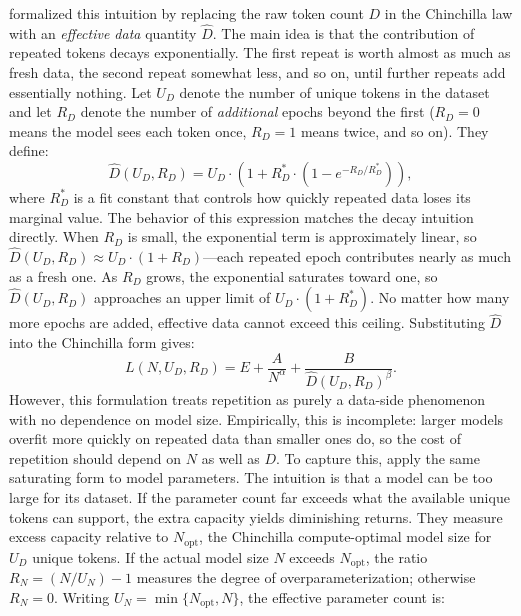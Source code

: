 \citet{muennighoff2023scaling} formalized this intuition by replacing the raw token count $D$ in the Chinchilla law with an \emph{effective data} quantity $\widehat{D}$. The main idea is that the contribution of repeated tokens decays exponentially. The first repeat is worth almost as much as fresh data, the second repeat somewhat less, and so on, until further repeats add essentially nothing. Let $U_D$ denote the number of unique tokens in the dataset and let $R_D$ denote the number of \emph{additional} epochs beyond the first ($R_D = 0$ means the model sees each token once, $R_D = 1$ means twice, and so on). They define:
\begin{equation}
    \widehat{D}(U_D, R_D) = U_D \cdot \left(1 + R_D^* \cdot \left(1 - e^{-R_D / R_D^*}\right)\right),
    \label{eq:muennighoff_deff}
\end{equation}
where $R_D^*$ is a fit constant that controls how quickly repeated data loses its marginal value. The behavior of this expression matches the decay intuition directly. When $R_D$ is small, the exponential term is approximately linear, so $\widehat{D}(U_D, R_D) \approx U_D \cdot (1 + R_D)$---each repeated epoch contributes nearly as much as a fresh one. As $R_D$ grows, the exponential saturates toward one, so $\widehat{D}(U_D, R_D)$ approaches an upper limit of $U_D \cdot (1 + R_D^*)$. No matter how many more epochs are added, effective data cannot exceed this ceiling. Substituting $\widehat{D}$ into the Chinchilla form gives:
\begin{equation}
    L(N, U_D, R_D) = E + \frac{A}{N^\alpha} + \frac{B}{\widehat{D}(U_D, R_D)^\beta}.
    \label{eq:muennighoff_loss}
\end{equation}
However, this formulation treats repetition as purely a data-side phenomenon with no dependence on model size. Empirically, this is incomplete: larger models overfit more quickly on repeated data than smaller ones do, so the cost of repetition should depend on $N$ as well as $D$. To capture this, \citet{muennighoff2023scaling} apply the same saturating form to model parameters. The intuition is that a model can be too large for its dataset. If the parameter count far exceeds what the available unique tokens can support, the extra capacity yields diminishing returns. They measure excess capacity relative to $N_{\text{opt}}$, the Chinchilla compute-optimal model size for $U_D$ unique tokens. If the actual model size $N$ exceeds $N_{\text{opt}}$, the ratio $R_N = (N / U_N) - 1$ measures the degree of overparameterization; otherwise $R_N = 0$. Writing $U_N = \min\{N_{\text{opt}}, N\}$, the effective parameter count is:
